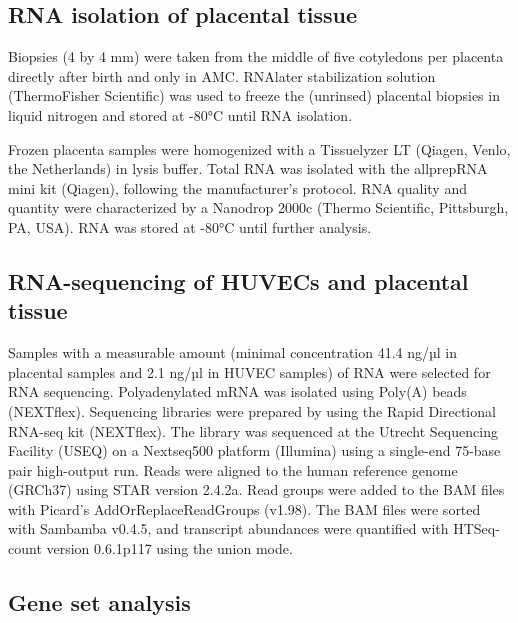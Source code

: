 \documentclass[authordate, empirical]{jote-new-article}
\begin{document}
\subsection{RNA isolation of placental tissue}



Biopsies (4 by 4 mm) were taken from the middle of five cotyledons per placenta directly after birth and only in AMC. RNAlater stabilization solution (ThermoFisher Scientific) was used to freeze the (unrinsed) placental biopsies in liquid nitrogen and stored at -80°C until RNA isolation.

Frozen placenta samples were homogenized with a Tissuelyzer LT (Qiagen, Venlo, the Netherlands) in lysis buffer. Total RNA was isolated with the allprepRNA mini kit (Qiagen), following the manufacturer's protocol. RNA quality and quantity were characterized by a Nanodrop 2000c (Thermo Scientific, Pittsburgh, PA, USA). RNA was stored at -80°C until further analysis.







\subsection{RNA-sequencing of HUVECs and placental tissue}



Samples with a measurable amount (minimal concentration 41.4 ng/µl in placental samples and 2.1 ng/µl in HUVEC samples) of RNA were selected for RNA sequencing. Polyadenylated mRNA was isolated using Poly(A) beads (NEXTflex). Sequencing libraries were prepared by using the Rapid Directional RNA-seq kit (NEXTflex). The library was sequenced at the Utrecht Sequencing Facility (USEQ) on a Nextseq500 platform (Illumina) using a single-end 75-base pair high-output run. Reads were aligned to the human reference genome (GRCh37) using STAR version 2.4.2a. Read groups were added to the BAM files with Picard's AddOrReplaceReadGroups (v1.98). The BAM files were sorted with Sambamba v0.4.5, and transcript abundances were quantified with HTSeq-count version 0.6.1p117 using the union mode.







\subsection{Gene set analysis }
\end{document}

